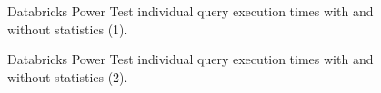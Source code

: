 \begin{figure}
   \begin{center}
   \end{center}
   \caption{Databricks Power Test individual query execution times with and without statistics (1).}
   \label{fig:additionalResultsDatabricksWithStatsPowerTestIndividualQueries1}
\end{figure}

\begin{figure}
   \begin{center}
   \end{center}
   \caption{Databricks Power Test individual query execution times with and without statistics (2).}
   \label{fig:additionalResultsDatabricksWithStatsPowerTestIndividualQueries2}
\end{figure}

